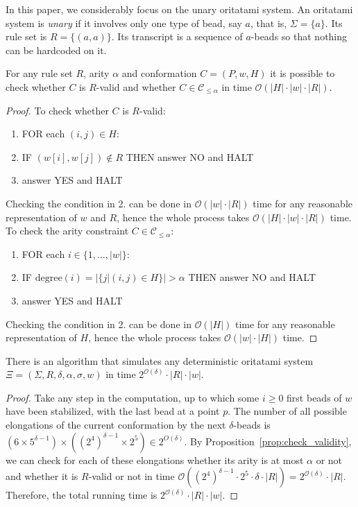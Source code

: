 \documentclass[runningheads]{llncs}
\begin{document}
In this paper, we considerably focus on the unary oritatami system. 
An oritatami system is \textit{unary} if it involves only one type of bead, say $a$, that is, $\Sigma = \{a\}$. 
Its rule set is $R = \{(a, a)\}$. 
Its transcript is a sequence of $a$-beads so that nothing can be hardcoded on it. 


\begin{proposition}\label{prop:check_validity}
	For any rule set $R$, arity $\alpha$ and conformation $C = (P,w,H)$ it is possible to check whether $C$ is $R$-valid and whether $C\in \mathcal{C}_{\leq \alpha}$ in time $\mathcal{O}(|H|\cdot|w|\cdot|R|)$.
\end{proposition}
\begin{proof}
	To check whether $C$ is $R$-valid:
	\begin{enumerate}
		\item FOR each $(i,j)\in H$:
		\item \hspace{1cm} IF $(w[i],w[j])\notin R$ THEN answer NO and HALT
		\item answer YES and HALT
	\end{enumerate}	
	Checking the condition in 2. can be done in $\mathcal{O}(|w|\cdot|R|)$ time for any reasonable representation of $w$ and $R$, hence the whole process takes $\mathcal{O}(|H|\cdot |w|\cdot|R|)$ time.	
	To check the arity constraint $C\in \mathcal{C}_{\leq \alpha}$: 
	\begin{enumerate}
		\item FOR each $i\in \{1,\dots,|w|\}$:
		\item \hspace{1cm} IF $\mathrm{degree}(i)=|\{j | (i,j)\in H \}|>\alpha$ THEN answer NO and HALT
		\item answer YES and HALT
	\end{enumerate}	
	Checking the condition in 2. can be done in $\mathcal{O}(|H|)$ time for any reasonable representation of $H$, hence the whole process takes $\mathcal{O}(|w|\cdot|H|)$ time.
\end{proof}

\begin{theorem}\label{thm:OS_to_2dTM}
	There is an algorithm that simulates any deterministic oritatami system $\Xi = (\Sigma, R, \delta, \alpha, \sigma, w)$ in time $2^{\mathcal{O}(\delta)}\cdot |R|\cdot|w|$. 
\end{theorem}
\begin{proof}
	Take any step in the computation, up to which some $i \ge 0$ first beads of $w$ have been stabilized, with the last bead at a point $p$. 
	The number of all possible elongations of the current conformation by the next $\delta$-beads is $(6 \times 5^{\delta-1}) \times ((2^4)^{\delta-1} \times 2^5) \in 2^{O(\delta)}$. 
	By Proposition~\ref{prop:check_validity}, we can check for each of these elongations whether its arity is at most $\alpha$ or not and whether it is $R$-valid or not in time $\mathcal{O}((2^4)^{\delta-1}\cdot2^5\cdot \delta\cdot|R|)=2^{\mathcal{O}(\delta)}\cdot|R|$.  Therefore, the total running time is $2^{\mathcal{O}(\delta)}\cdot |R|\cdot|w|$.
\end{proof}
\end{document}
